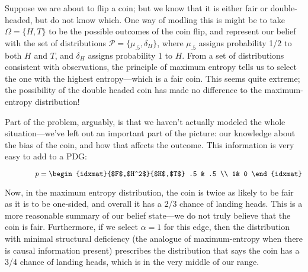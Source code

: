 \begin{example}
    \label{ex:coin}
Suppose we are about to flip a coin; but we know that it is either fair or double-headed, but do not know which.
One way of modling this is might be to take $\Omega = \{ H, T\}$ to be the possible outcomes of the coin flip, and represent our belief with the set of distributions
$\mathcal P = \{ \mu_{.5}, \delta_H \}$, where $\mu_{.5}$ assigns probability 1/2 to both $H$ and $T$, and $\delta_H$ assigns probability 1 to $H$. 
From a set of distributions consistent with observations, the principle of maximum entropy tells us to select the one with the highest entropy---which is a fair coin. 
This seems quite extreme; the possibility of the double headed coin has made no difference to the maximum-entropy distribution!

Part of the problem, arguably, is that we haven't actually modeled the whole situation---we've left out an important part of the picture: our knowledge about the bias of the coin, and how that affects the outcome.  This information is very easy to add to a PDG: 

\begin{center}
$\qquad\qquad\displaystyle
p = 
\begin{idxmat}{$F$,$H^2$}{$H$,$T$}
    .5 & .5 \\ 1& 0
\end{idxmat}
$
\end{center}

Now, in the maximum entropy distribution, the coin is twice as likely to be fair as it is to be one-sided, and overall it has a 2/3 chance of landing heads. 
This is a more reasonable summary of our belief state---we do not truly believe that the coin is fair.
Furthermore, if we select $\alpha = 1$ for this edge, 
then the distribution with minimal structural deficiency (the analogue of maximum-entropy when there is causal information present) prescribes the distribution that says the coin has a 3/4 chance of landing heads, which is in the very middle of our range. 
\end{example}

